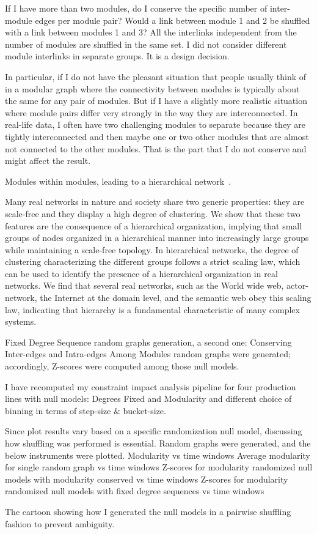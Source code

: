 {\color{red} 
	If I have more than two modules, do I conserve the specific number of inter-module edges per module pair? Would a link between module 1 and 2 be shuffled with a link between modules 1 and 3? 
	All the interlinks independent from the number of modules are shuffled in the same set. I did not consider different module interlinks in separate groups. It is a design decision.
	
	In particular, if I do not have the pleasant situation that people usually think of in a modular graph where the connectivity between modules is typically about the same for any pair of modules. But if I have a slightly more realistic situation where module pairs differ very strongly in the way they are interconnected. In real-life data, I often have two challenging modules to separate because they are tightly interconnected and then maybe one or two other modules that are almost not connected to the other modules. That is the part that I do not conserve and might affect the result.
	
	Modules within modules, leading to a hierarchical network~\cite{Hutt2008}.
	
	Many real networks in nature and society share two generic properties: they are scale-free and they display a high degree of clustering. We show that these two features are the consequence of a hierarchical organization, implying that small groups of nodes organized in a hierarchical manner into increasingly large groups while maintaining a scale-free topology. In hierarchical networks, the degree of clustering characterizing the different groups follows a strict scaling law, which can be used to identify the presence of a hierarchical organization in real networks. We find that several real networks, such as the World wide web, actor-network, the Internet at the domain level, and the semantic web obey this scaling law, indicating that hierarchy is a fundamental characteristic of many complex systems.~\cite{Barabasi2003}
	
	Fixed Degree Sequence random graphs generation, a second one: Conserving Inter-edges and Intra-edges Among Modules random graphs were generated; accordingly, Z-scores were computed among those null models.
	
	I have recomputed my constraint impact analysis pipeline for four production lines with null models: Degrees Fixed and Modularity and different choice of binning in terms of step-size \& bucket-size.
	
	Since plot results vary based on a specific randomization null model, discussing how shuffling was performed is essential. 
	Random graphs were generated, and the below instruments were plotted.
	Modularity vs time windows
	Average modularity for single random graph vs time windows
	Z-scores for modularity randomized null models with modularity conserved vs time windows
	Z-scores for modularity randomized null models with fixed degree sequences vs time windows
	
	The cartoon showing how I generated the null models in a pairwise shuffling fashion to prevent ambiguity.}


